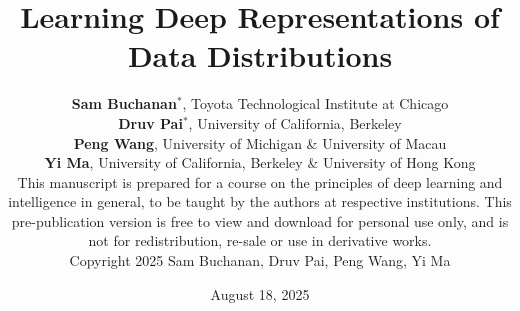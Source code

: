 \documentclass{book}
\begin{document}
\title{Learning Deep Representations of Data Distributions}

\author{\vspace{0.5cm}
\textbf{Sam Buchanan}$^*$, Toyota Technological Institute at Chicago \vspace{3mm}\\
    \textbf{Druv Pai}$^*$, University of California, Berkeley \vspace{3mm} \\
    \textbf{Peng Wang}, University of Michigan \& 
    University of Macau  \vspace{3mm} \\
    \textbf{Yi Ma},   University of California, Berkeley \& University of Hong Kong
	\vspace{8cm}\\
	\footnotesize
	This manuscript is prepared for a course on the principles of deep learning
  and intelligence in general, to be taught by the authors at respective
  institutions. This pre-publication version is free to view and download for
  personal use only, and is not for redistribution, re-sale or use in derivative
  works.\\  Copyright  2025 Sam Buchanan, Druv Pai, Peng Wang, Yi
  Ma
}

\date{\large August 18, 2025}

\frontmatter
\titlepage
\thispagestyle{empty}
\maketitle

\cleardoublepage

% 

% 

% 


\cleardoublepage
\end{document}
